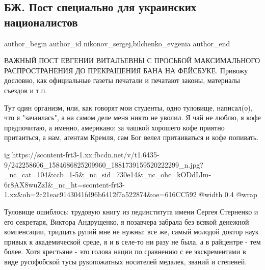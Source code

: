  
 
 
 
 
 
\subsection{БЖ. Пост специально для украинских националистов}
\label{sec:19_09_2021.fb.nikonov_sergej.1.bilchenko_dlja_nacionalistov}
 
\ifcmt
 author_begin
   author_id nikonov_sergej,bilchenko_evgenia
 author_end
\fi

ВАЖНЫЙ ПОСТ ЕВГЕНИИ ВИТАЛЬЕВНЫ С ПРОСЬБОЙ МАКСИМАЛЬНОГО РАСПРОСТРАНЕНИЯ ДО
ПРЕКРАЩЕНИЯ БАНА НА ФЕЙСБУКЕ.  Привожу дословно, как официальные газеты
печатали и  печатают законы, материалы съездов и т.п. 


Тут один организм, или, как говорят мои студенты, одно туловище, написал(о),
что я "зачаилась", а на самом деле меня никто не уволил. Я чай не люблю, я кофе
предпочитаю, а именно, американо: за чашкой хорошего кофе приятно притаиться, а
нам, агентам Кремля, сам Бог велел притаиваться и кофе попивать.

\ifcmt
  ig https://scontent-frt3-1.xx.fbcdn.net/v/t1.6435-9/242258606_1584686825209960_1881739159520222299_n.jpg?_nc_cat=104&ccb=1-5&_nc_sid=730e14&_nc_ohc=kODdLIm-6r8AX8wuZzI&_nc_ht=scontent-frt3-1.xx&oh=2c21eac9143041fd96b6412f7a522874&oe=616CC592
  @width 0.4
  @wrap 
\fi

Туловище ошиблось: трудовую книгу из пединститута имени Сергея Стерненко и его
секретаря, Виктора Андрущенко, я позавчера забрала без всякой денежной
компенсации, тридцать рупий мне не нужны: все же, самый молодой доктор наук
привык к академической среде, я и в селе-то ни разу не была, а в райцентре -
тем более. Хотя крестьяне - это голова нации по сравнению с ее экскрементами в
виде русофобской тусы рукопожатных носителей медалек, званий и степеней.

